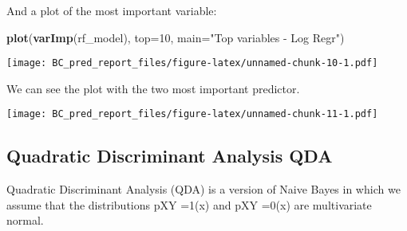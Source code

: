 \documentclass[]{article}
\newenvironment{Shaded}{\begin{snugshade}}{\end{snugshade}}
\newcommand{\CommentTok}[1]{\textcolor[rgb]{0.56,0.35,0.01}{\textit{#1}}}
\newcommand{\DataTypeTok}[1]{\textcolor[rgb]{0.13,0.29,0.53}{#1}}
\newcommand{\DecValTok}[1]{\textcolor[rgb]{0.00,0.00,0.81}{#1}}
\newcommand{\KeywordTok}[1]{\textcolor[rgb]{0.13,0.29,0.53}{\textbf{#1}}}
\newcommand{\NormalTok}[1]{#1}
\newcommand{\OperatorTok}[1]{\textcolor[rgb]{0.81,0.36,0.00}{\textbf{#1}}}
\newcommand{\StringTok}[1]{\textcolor[rgb]{0.31,0.60,0.02}{#1}}
\begin{document}
And a plot of the most important variable:

\begin{Shaded}
\begin{Highlighting}[]
\KeywordTok{plot}\NormalTok{(}\KeywordTok{varImp}\NormalTok{(rf_model), }\DataTypeTok{top=}\DecValTok{10}\NormalTok{, }\DataTypeTok{main=}\StringTok{"Top variables - Log Regr"}\NormalTok{)}
\end{Highlighting}
\end{Shaded}

\texttt{[image: BC\_pred\_report\_files/figure-latex/unnamed-chunk-10-1.pdf]}

We can see the plot with the two most important predictor.

\begin{Shaded}
\end{Shaded}

\texttt{[image: BC\_pred\_report\_files/figure-latex/unnamed-chunk-11-1.pdf]}

\hypertarget{quadratic-discriminant-analysis-qda}{%
\subsection{Quadratic Discriminant Analysis
QDA}\label{quadratic-discriminant-analysis-qda}}

Quadratic Discriminant Analysis (QDA) is a version of Naive Bayes in
which we assume that the distributions pX\textbar Y =1(x) and
pX\textbar Y =0(x) are multivariate normal.

\begin{Shaded}
\end{Shaded}
\end{document}
